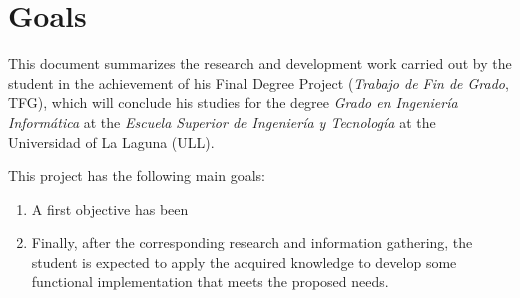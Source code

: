 %
%
%
%


\chapter{Goals} \label{chap:Goals}  
This document summarizes the research and development work carried out by the student in the achievement of his Final Degree Project (\textit{Trabajo de Fin de Grado}, TFG), which will conclude his studies for the degree \textit{Grado en Ingeniería Informática} at the \textit{Escuela Superior de Ingeniería y Tecnología} at the Universidad of La Laguna (ULL).

This project has the following main goals:

\begin{enumerate}
\item A first objective has been 

\item Finally, after the corresponding research and information gathering, the student is expected to apply the acquired knowledge to develop some functional implementation that meets the proposed needs.
\end{enumerate}
